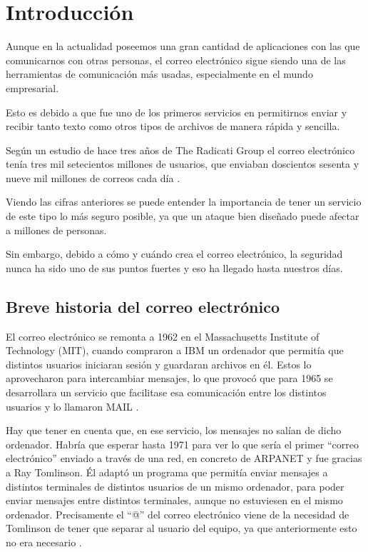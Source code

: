 \chapter{Introducción}
Aunque en la actualidad poseemos una gran cantidad de aplicaciones con las que comunicarnos con otras personas, el correo electrónico sigue siendo una de las herramientas de comunicación más usadas, especialmente en el mundo empresarial. 

Esto es debido a que fue uno de los primeros servicios en permitirnos enviar y recibir tanto texto como otros tipos de archivos de manera rápida y sencilla. 

Según un estudio de hace tres años de The Radicati Group el correo electrónico tenía tres mil setecientos millones de usuarios, que enviaban doscientos sesenta y nueve mil millones de correos cada día \cite{cifrasCorreo}.

Viendo las cifras anteriores se puede entender la importancia de tener un servicio de este tipo lo más seguro posible, ya que un ataque bien diseñado puede afectar a millones de personas.

Sin embargo, debido a cómo y cuándo crea el correo electrónico, la seguridad nunca ha sido uno de sus puntos fuertes y eso ha llegado hasta nuestros días.
 
\section{Breve historia del correo electrónico}
El correo electrónico se remonta a 1962 en el Massachusetts Institute of Technology (MIT), cuando compraron a IBM un ordenador que permitía que distintos usuarios iniciaran sesión y guardaran archivos en él. Estos lo aprovecharon para intercambiar mensajes, lo que provocó que para 1965 se desarrollara un servicio que facilitase esa comunicación entre los distintos usuarios y lo llamaron MAIL \cite{mail_history}.

Hay que tener en cuenta que, en ese servicio, los mensajes no salían de dicho ordenador. Habría que esperar hasta 1971 para ver lo que sería el primer “correo electrónico” enviado a través de una red, en concreto de ARPANET y fue gracias a Ray Tomlinson. Él adaptó un programa que permitía enviar mensajes a distintos terminales de distintos usuarios de un mismo ordenador, para poder enviar mensajes entre distintos terminales, aunque no estuviesen en el mismo ordenador. Precisamente el “@” del correo electrónico viene de la necesidad de Tomlinson de tener que separar al usuario del equipo, ya que anteriormente esto no era necesario \cite{Tomlinson}.

